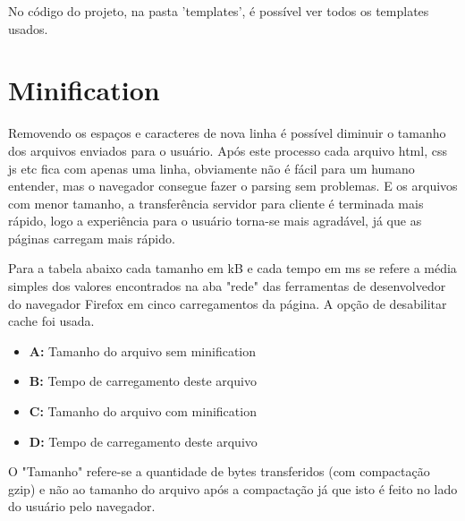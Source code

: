 No código do projeto, na pasta 'templates', é possível ver todos os templates usados.

\section{Minification}

Removendo os espaços e caracteres de nova linha é possível diminuir o tamanho dos arquivos enviados
para o usuário. Após este processo cada arquivo html, css js etc fica com apenas uma linha, obviamente
não é fácil para um humano entender, mas o navegador consegue fazer o parsing sem problemas. E os arquivos
com menor tamanho, a transferência servidor para cliente é terminada mais rápido, logo a experiência
para o usuário torna-se mais agradável, já que as páginas carregam mais rápido.

Para a tabela abaixo cada tamanho em kB e cada tempo em ms se refere a média simples dos valores 
encontrados na aba "rede" das ferramentas de desenvolvedor do navegador Firefox em cinco 
carregamentos da página. A opção de desabilitar cache foi usada.

\begin{itemize}
\item \textbf{A:} Tamanho do arquivo sem minification
\item \textbf{B:} Tempo de carregamento deste arquivo
\item \textbf{C:} Tamanho do arquivo com minification
\item \textbf{D:} Tempo de carregamento deste arquivo
\end {itemize}

O "Tamanho" refere-se a quantidade de bytes transferidos (com compactação gzip) e não ao 
tamanho do arquivo após a compactação já que isto é feito no lado do usuário pelo navegador.


